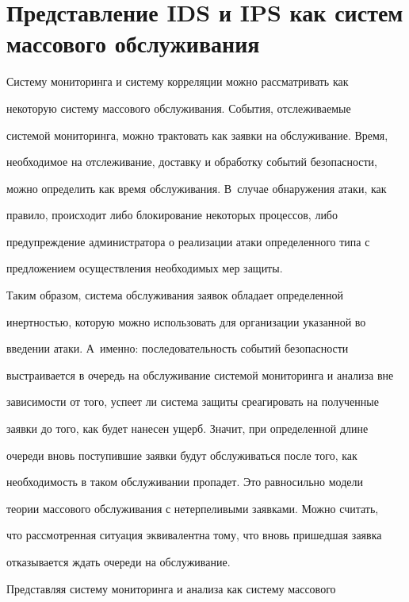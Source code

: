 \section{Представление IDS и IPS как систем массового обслуживания}





    Систему мониторинга и систему корреляции можно рассматривать как 

некоторую систему массового обслуживания. События, отслеживаемые 

системой мониторинга, можно трактовать как заявки на обслуживание. Время, 

необходимое на отслеживание, доставку и обработку событий безопасности, 

можно определить как время обслуживания. В~случае обнаружения атаки, как 

правило, происходит либо блокирование некоторых процессов, либо 

предупреждение администратора о реализации атаки определенного типа с 

предложением осуществления необходимых мер защиты. 

    

    Таким образом, система обслуживания заявок обладает определенной 

инертностью, которую можно использовать для организации указанной во 

введении атаки. А~именно: последовательность событий безопасности 

выстраивается в очередь на обслуживание системой мониторинга и анализа вне 

зависимости от того, успеет ли система защиты среагировать на полученные 

заявки до того, как будет нанесен ущерб. Значит, при определенной длине 

очереди вновь поступившие заявки будут обслуживаться после того, как 

необходимость в таком обслуживании пропадет. Это равносильно модели 

теории массового обслуживания с нетерпеливыми заявками. Можно считать, 

что рассмотренная ситуация эквивалентна тому, что вновь пришедшая заявка 

отказывается ждать очереди на обслуживание. 

    

    Представляя систему мониторинга и анализа как систему массового 

